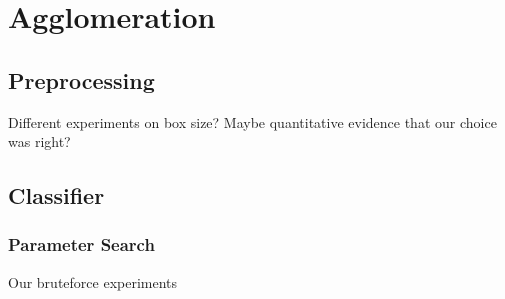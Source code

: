 \section{Agglomeration}

\subsection{Preprocessing}

Different experiments on box size? Maybe quantitative evidence that our choice was right?

\subsection{Classifier}

\subsubsection{Parameter Search}

Our bruteforce experiments

